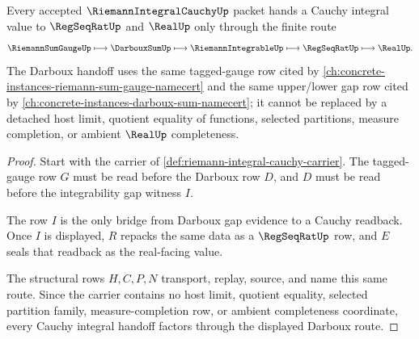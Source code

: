 \begin{theorem}
\label{thm:riemann-integral-cauchy-darboux-handoff}
Every accepted $\RiemannIntegralCauchyUp$ packet hands a Cauchy integral value to $\RegSeqRatUp$ and $\RealUp$ only through the finite route
$$
\RiemannSumGaugeUp \longmapsto \DarbouxSumUp \longmapsto \RiemannIntegrableUp \longmapsto \RegSeqRatUp \longmapsto \RealUp .
$$
The Darboux handoff uses the same tagged-gauge row cited by \autoref{ch:concrete-instances-riemann-sum-gauge-namecert} and the same upper/lower gap row cited by \autoref{ch:concrete-instances-darboux-sum-namecert}; it cannot be replaced by a detached host limit, quotient equality of functions, selected partitions, measure completion, or ambient $\RealUp$ completeness.
\end{theorem}
\begin{proof}
Start with the carrier of \autoref{def:riemann-integral-cauchy-carrier}. The tagged-gauge row $G$ must be read before the Darboux row $D$, and $D$ must be read before the integrability gap witness $I$.

The row $I$ is the only bridge from Darboux gap evidence to a Cauchy readback. Once $I$ is displayed, $R$ repacks the same data as a $\RegSeqRatUp$ row, and $E$ seals that readback as the real-facing value.

The structural rows $H,C,P,N$ transport, replay, source, and name this same route. Since the carrier contains no host limit, quotient equality, selected partition family, measure-completion row, or ambient completeness coordinate, every Cauchy integral handoff factors through the displayed Darboux route.
\end{proof}


\begin{closurestatus}{\RiemannIntegralCauchyUp}
  \theoryclosure{\seedClosure}
  \formalstatus{\unformalizedV}
\end{closurestatus}
